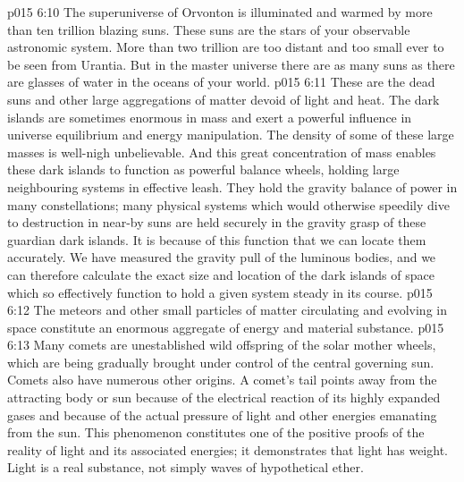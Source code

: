 \vs p015 6:10 The superuniverse of Orvonton is illuminated and warmed by more than ten trillion blazing suns. These suns are the stars of your observable astronomic system. More than two trillion are too distant and too small ever to be seen from Urantia. But in the master universe there are as many suns as there are glasses of water in the oceans of your world.
\vs p015 6:11 \pc {} These are the dead suns and other large aggregations of matter devoid of light and heat. The dark islands are sometimes enormous in mass and exert a powerful influence in universe equilibrium and energy manipulation. The density of some of these large masses is well\hyp{}nigh unbelievable. And this great concentration of mass enables these dark islands to function as powerful balance wheels, holding large neighbouring systems in effective leash. They hold the gravity balance of power in many constellations; many physical systems which would otherwise speedily dive to destruction in near-by suns are held securely in the gravity grasp of these guardian dark islands. It is because of this function that we can locate them accurately. We have measured the gravity pull of the luminous bodies, and we can therefore calculate the exact size and location of the dark islands of space which so effectively function to hold a given system steady in its course.
\vs p015 6:12 \pc {} The meteors and other small particles of matter circulating and evolving in space constitute an enormous aggregate of energy and material substance.
\vs p015 6:13 Many comets are unestablished wild offspring of the solar mother wheels, which are being gradually brought under control of the central governing sun. Comets also have numerous other origins. A comet’s tail points away from the attracting body or sun because of the electrical reaction of its highly expanded gases and because of the actual pressure of light and other energies emanating from the sun. This phenomenon constitutes one of the positive proofs of the reality of light and its associated energies; it demonstrates that light has weight. Light is a real substance, not simply waves of hypothetical ether.
